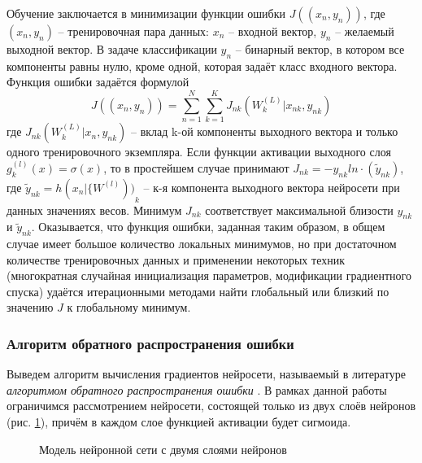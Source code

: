 \documentclass[../body.tex]{subfiles}
\begin{document}
Обучение заключается в минимизации функции ошибки $J((x_n,y_n))$, где $(x_n,y_n)$ – тренировочная пара данных: $x_n$ – входной вектор, $y_n$ – желаемый выходной вектор. В задаче классификации $y_n$ – бинарный вектор, в котором все компоненты равны нулю, кроме одной, которая задаёт класс входного вектора. Функция ошибки задаётся формулой
$$J((x_n,y_n))=\sum_{n=1}^{N}\sum_{k=1}^{K}{J_{nk}(W_k^{(L)}| x_{nk},y_{nk})}$$
где $J_{nk}(W_k^{(L)}| x_n,y_{nk})$ – вклад k-ой компоненты выходного вектора и только одного тренировочного экземпляра. Если функции активации выходного слоя $g_k^{(l)}(x)=\sigma(x)$, то в простейшем случае принимают $J_{nk}=-y_{nk}ln\cdot({\widetilde{y}}_{nk})$, где ${\widetilde{y}}_{nk}= h{(x_n|\{W^{(l)}))}_k$ – к-я компонента выходного вектора нейросети при данных значениях весов. Минимум $J_{nk}$ соответствует максимальной близости $y_{nk}$ и ${\widetilde{y}}_{nk}$. Оказывается, что функция ошибки, заданная таким образом, в общем случае имеет большое количество локальных минимумов, но при достаточном количестве тренировочных данных и применении некоторых техник (многократная случайная инициализация параметров, модификации градиентного спуска) удаётся итерационными методами найти глобальный или близкий по значению $J$ к глобальному минимум.

\subsubsection{Алгоритм обратного распространения ошибки}
Выведем алгоритм вычисления градиентов нейросети, называемый в литературе \textit{алгоритмом обратного распространения ошибки} \cite{gonsales} \cite{murphy}. В рамках данной работы ограничимся рассмотрением нейросети, состоящей только из двух слоёв нейронов (рис. \ref{nnetLayers}), причём в каждом слое функцией активации будет сигмоида.

\begin{figure}[H]
	\caption{Модель нейронной сети с двумя слоями нейронов}
	\label{nnetLayers}
\end{figure}
\end{document}
